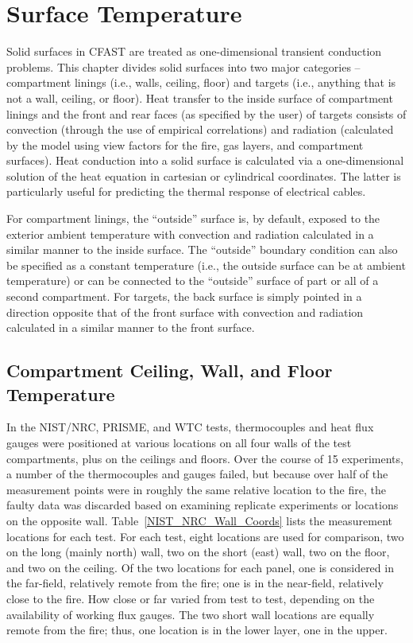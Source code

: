 
\chapter{Surface Temperature}

Solid surfaces  in CFAST are treated as one-dimensional transient conduction problems. This chapter divides solid surfaces into two major categories -- compartment linings (i.e., walls, ceiling, floor) and targets (i.e., anything that is not a wall, ceiling, or floor). Heat transfer to the inside surface of compartment linings and the front and rear faces (as specified by the user) of targets consists of convection (through the use of empirical correlations) and radiation (calculated by the model using view factors for the fire, gas layers, and compartment surfaces). Heat conduction into a solid surface is calculated via a one-dimensional solution of the heat equation in cartesian or cylindrical coordinates.  The latter is particularly useful for predicting the thermal response of electrical cables.

For compartment linings, the ``outside'' surface is, by default, exposed to the exterior ambient temperature with convection and radiation calculated in a similar manner to the inside surface.  The ``outside'' boundary condition can also be specified as a constant temperature (i.e., the outside surface can be at ambient temperature) or can be connected to the ``outside'' surface of part or all of a second compartment.  For targets, the back surface is simply pointed in a direction opposite that of the front surface with convection and radiation calculated in a similar manner to the front surface.

\section{ Compartment Ceiling, Wall, and Floor Temperature}

In the NIST/NRC, PRISME, and WTC tests, thermocouples and heat flux gauges were positioned at various locations on all four walls of the test compartments, plus on the ceilings and floors. Over the course of 15 experiments, a number of the thermocouples and gauges failed, but because over half of the measurement points were in roughly the same relative location to the fire, the faulty data was discarded based on examining replicate experiments or locations on the opposite wall. Table~\ref{NIST_NRC_Wall_Coords} lists the measurement locations for each test. For each test, eight locations are used for comparison, two on the long (mainly north) wall, two on the short (east) wall, two on the floor, and two on the ceiling.  Of the two locations for each panel, one is considered in the far-field, relatively remote from the fire; one is in the near-field, relatively close to the fire.  How close or far varied from test to test, depending on the availability of working flux gauges. The two short wall locations are equally remote from the fire; thus, one location is in the lower layer, one in the upper.

